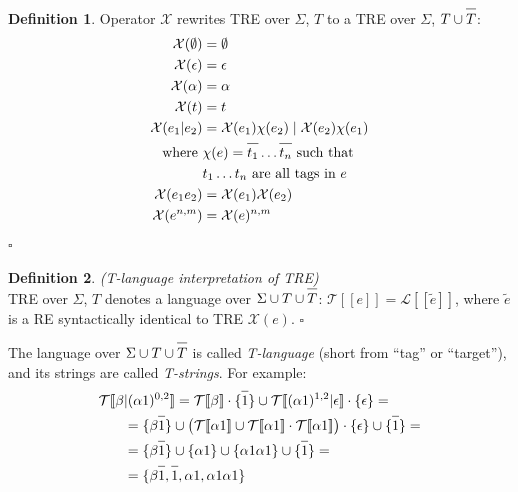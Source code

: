 \documentclass{article}
\newcommand{\Xlb}{[\![}
\newcommand{\Xrb}{]\!]}
\newcommand{\XL}{\mathcal{L}}
\newcommand{\XT}{\mathcal{T}}
\newcommand{\XX}{\mathcal{X}}
\newcommand*{\Xbar}[1]{\overline{#1\vphantom{\bar{#1}}}}
\theoremstyle{definition}
\newtheorem{Xdef}{Definition}
\begin{document}
\begin{multicols}{2}
    \begin{Xdef}\label{deftlang}
    Operator $\XX$ rewrites TRE over $\Sigma$, $T$ to a TRE over $\Sigma$, $T \cup \Xbar{T}$:
    \begin{align*}
        \XX(\emptyset) &= \emptyset \\
        \XX(\epsilon) &= \epsilon \\
        \XX(\alpha) &= \alpha \\
        \XX(t) &= t \\
        \XX(e_1 | e_2)
            &=      \XX(e_1) \chi(e_2) \mid \XX(e_2) \chi(e_1) \\
            \text{where }
                &\chi(e) = \Xbar{t_1} \dots \Xbar{t_n} \text{ such that} \\
                &t_1 \dots t_n \text{ are all tags in } e \\
        \XX(e_1 e_2) &= \XX(e_1) \XX(e_2) \\
        \XX(e^{n,m}) &= \XX(e)^{n,m}
    \end{align*}
    $\square$
    \end{Xdef}

    \begin{Xdef}\label{deftlang}
    \emph{(T-language interpretation of TRE)} \\
    TRE over $\Sigma$, $T$ denotes a language over $\Sigma \cup T \cup \Xbar{T}$:
    $\XT \Xlb e \Xrb = \XL \Xlb \widetilde{e} \Xrb$, where $\widetilde{e}$ is a RE
    syntactically identical to TRE $\XX(e)$.
    $\square$
    \end{Xdef}

The language over $\Sigma \cup T \cup \Xbar{T}$ is called \emph{T-language}
(short from ``tag'' or ``target''), and its strings are called \emph{T-strings}.
For example:
\begin{align*}
    \XT \Xlb \beta &| (\alpha 1)^{0,2} \Xrb
=
    \XT \Xlb \beta \Xrb \cdot \{\Xbar{1}\} \cup
    \XT \Xlb (\alpha 1)^{1,2} | \epsilon \Xrb \cdot \{\epsilon\} = \\
&=
    \{\beta \Xbar{1}\} \cup
    \big(\XT \Xlb \alpha 1 \Xrb
            \cup \XT \Xlb \alpha 1 \Xrb \cdot \XT \Xlb \alpha 1 \Xrb
        \big) \cdot \{\epsilon\}
        \cup \{\Xbar{1}\} = \\
&=
    \{\beta \Xbar{1}\} \cup
    \{\alpha 1 \} \cup
    \{\alpha 1 \alpha 1 \} \cup
    \{\Xbar{1}\} = \\
&=
    \{\beta \Xbar{1}, \Xbar{1}, \alpha 1, \alpha 1 \alpha 1 \}
\end{align*}


\end{multicols}
\end{document}
